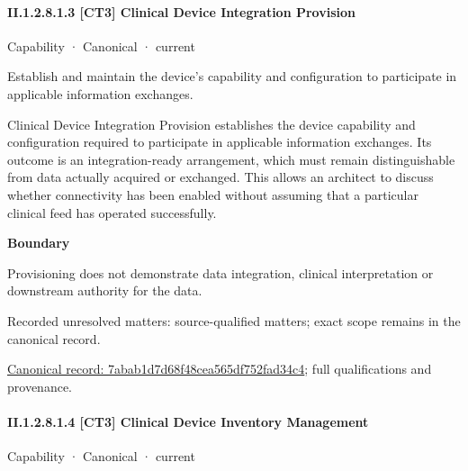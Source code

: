 \paragraph*{II.1.2.8.1.3 [CT3] Clinical Device Integration Provision}
\label{navigation:II.1.2.8.1.3}

\label{element:7abab1d7d68f48cea565df752fad34c4}
{\small Capability · Canonical · current}\par

Establish and maintain the device’s capability and configuration to participate in applicable information exchanges.



Clinical Device Integration Provision establishes the device capability and configuration required to participate in applicable information exchanges. Its outcome is an integration-ready arrangement, which must remain distinguishable from data actually acquired or exchanged. This allows an architect to discuss whether connectivity has been enabled without assuming that a particular clinical feed has operated successfully.



\textbf{Boundary}



Provisioning does not demonstrate data integration, clinical interpretation or downstream authority for the data.


{\small Recorded unresolved matters: source-qualified matters; exact scope remains in the canonical record.}\par
{\footnotesize \href{../../../../continuum/strategy/capability/7abab1d7d68f48cea565df752fad34c4.md}{Canonical record: 7abab1d7d68f48cea565df752fad34c4}; full qualifications and provenance.}\par
\paragraph*{II.1.2.8.1.4 [CT3] Clinical Device Inventory Management}
\label{navigation:II.1.2.8.1.4}

\label{element:f8205d4cf8144f34b2da1139ff45c868}
{\small Capability · Canonical · current}\par

